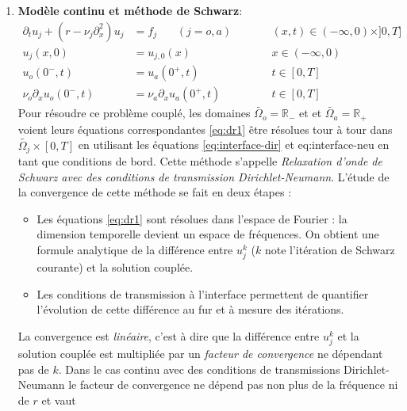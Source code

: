 \begin{enumerate}
\item \textbf{Modèle continu et méthode de Schwarz}:
\begin{subequations}
\begin{align}
\partial_t u_j +( r - \nu_j \partial_x^2) u_j &= f_j ~~~~~~~~
(j=o,a) &\qquad&
(x,t) \in (-\infty,0) \times ]0,T] \label{eq:dr1} \\
u_j(x,0) &= u_{j,0}(x)   &\qquad&  x \in (-\infty,0)  \\
u_o(0^-,t) &=  u_a(0^+,t) &\qquad& t \in [0,T] \label{eq:interface-dir} \\
\nu_o \partial_x u_o(0^-,t) &= \nu_a \partial_x u_a(0^+,t) &\qquad& t \in [0,T] \label{eq:interface-neu} 
\end{align}
\label{eq:resume_francais_model-problem}
\end{subequations}
Pour résoudre ce problème couplé, les domaines
$\widetilde{\Omega_o} = \mathbb{R_{-}}$ et
et $\widetilde{\Omega_a} = \mathbb{R_{+}}$ voient leurs équations
correspondantes \eqref{eq:dr1} être résolues tour à tour
dans $\widetilde{\Omega_j} \times [0,T]$
en utilisant les équations
\eqref{eq:interface-dir} et {eq:interface-neu}
en tant que conditions de bord.
Cette méthode s'appelle \textit{Relaxation d'onde de Schwarz avec
des conditions de transmission Dirichlet-Neumann}.
L'étude de la convergence de cette méthode se fait en deux étapes :
\begin{itemize}
\item Les équations \eqref{eq:dr1} sont résolues dans l'espace de
	Fourier : la dimension temporelle devient un espace
	de fréquences. On obtient une formule analytique de
	la différence entre $u_j^k$
	($k$ note l'itération de Schwarz courante)
	et la solution couplée.
\item Les conditions de transmission à l'interface permettent
	de quantifier l'évolution de cette différence au fur et
	à mesure des itérations.
\end{itemize}
 La convergence est \textit{linéaire},
 c'est à dire que la différence entre $u_j^k$ et la solution couplée
 est multipliée par un \textit{facteur de convergence} ne dépendant
 pas de $k$. Dans le cas continu avec des conditions
 de transmissions Dirichlet-Neumann le facteur de convergence ne
 dépend pas non plus de la fréquence ni de $r$ et vaut

\end{enumerate}

